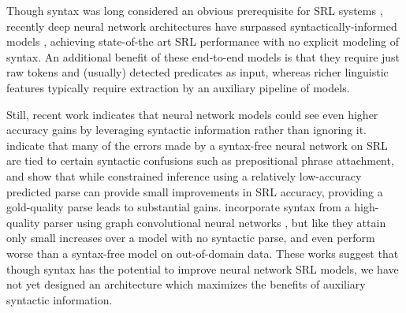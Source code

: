 \documentclass[11pt,a4paper]{article}
\begin{document}
Though syntax was long considered an obvious prerequisite for SRL systems \citep{levin1993english,punyakanok2008importance}, recently deep neural network architectures have surpassed syntactically-informed models \citep{zhou2015end, marcheggiani2017simple, he2017deep, tan2018deep, he2018jointly}, achieving state-of-the art SRL performance with no explicit modeling of syntax. 
An additional benefit of these end-to-end models is that they require just raw tokens and (usually) detected predicates as input, whereas richer linguistic features typically require extraction by an auxiliary pipeline of models.

Still, recent work \citep{roth2016neural,he2017deep,marcheggiani2017encoding} indicates that neural network models could see even higher accuracy gains by leveraging syntactic information rather than ignoring it. \citet{he2017deep} indicate that many of the errors made by a syntax-free neural network on SRL are tied to certain syntactic confusions such as prepositional phrase attachment, and show that while constrained inference using a relatively low-accuracy predicted parse can provide small improvements in SRL accuracy, providing a gold-quality parse leads to substantial gains. \citet{marcheggiani2017encoding} incorporate syntax from a high-quality parser \citep{kiperwasser2016simple} using graph convolutional neural networks \citep{kipf2017semi}, but like \citet{he2017deep} they attain only small increases over a model with no syntactic parse, and even perform worse than a syntax-free model on out-of-domain data. These works suggest that though syntax has the potential to improve neural network SRL models, we have not yet designed an architecture which maximizes the benefits of auxiliary syntactic information. 
\end{document}
